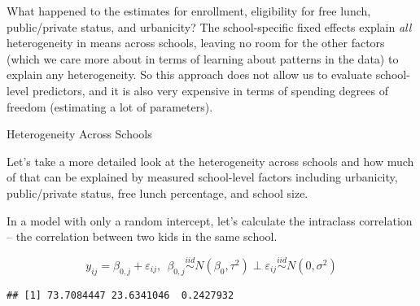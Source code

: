 \documentclass[ignorenonframetext,]{beamer}
\newenvironment{Shaded}{\begin{snugshade}}{\end{snugshade}}
\newcommand{\KeywordTok}[1]{\textcolor[rgb]{0.13,0.29,0.53}{\textbf{#1}}}
\newcommand{\DataTypeTok}[1]{\textcolor[rgb]{0.13,0.29,0.53}{#1}}
\newcommand{\DecValTok}[1]{\textcolor[rgb]{0.00,0.00,0.81}{#1}}
\newcommand{\CommentTok}[1]{\textcolor[rgb]{0.56,0.35,0.01}{\textit{#1}}}
\newcommand{\OtherTok}[1]{\textcolor[rgb]{0.56,0.35,0.01}{#1}}
\newcommand{\OperatorTok}[1]{\textcolor[rgb]{0.81,0.36,0.00}{\textbf{#1}}}
\newcommand{\NormalTok}[1]{#1}
\begin{document}
\begin{frame}{}

What happened to the estimates for enrollment, eligibility for free
lunch, public/private status, and urbanicity? The school-specific fixed
effects explain \emph{all} heterogeneity in means across schools,
leaving no room for the other factors (which we care more about in terms
of learning about patterns in the data) to explain any heterogeneity. So
this approach does not allow us to evaluate school-level predictors, and
it is also very expensive in terms of spending degrees of freedom
(estimating a lot of parameters).

\end{frame}

\begin{frame}[fragile]{Heterogeneity Across Schools}

Let's take a more detailed look at the heterogeneity across schools and
how much of that can be explained by measured school-level factors
including urbanicity, public/private status, free lunch percentage, and
school size.

In a model with only a random intercept, let's calculate the intraclass
correlation -- the correlation between two kids in the same school.

\[y_{ij}=\beta_{0,j}+\varepsilon_{ij}, ~~ \beta_{0,j}\overset{iid}{\sim} N(\beta_0,\tau^2) \perp \varepsilon_{ij}\overset{iid}\sim N(0, \sigma^2)\]

\begin{Shaded}
\end{Shaded}

\begin{verbatim}
## [1] 73.7084447 23.6341046  0.2427932
\end{verbatim}

\end{frame}
\end{document}
